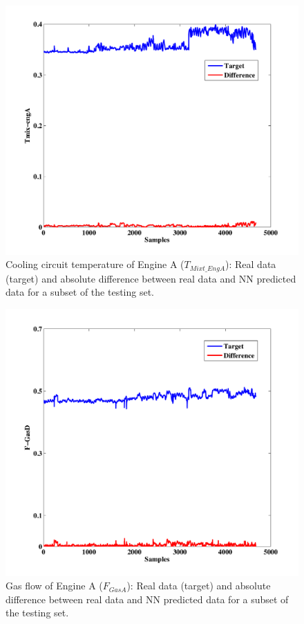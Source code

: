 \begin{figure}
\centering
\includegraphics[width=1\textwidth]{figures/TmixEngA.pdf}
\caption{Cooling circuit temperature of Engine A ($T_{Mixt\_EngA}$): Real data (target) and absolute difference between real data and NN predicted data for a subset of the testing set.}
\label{TcoolA}
\end{figure}

\begin{figure}
\centering
\includegraphics[width=1\textwidth]{figures/FGASD.pdf}
\caption{Gas flow  of Engine A ($F_{GasA}$): Real data (target) and absolute difference between real data and NN predicted data for a subset of the testing set.}
\label{FengineA}
\end{figure}

